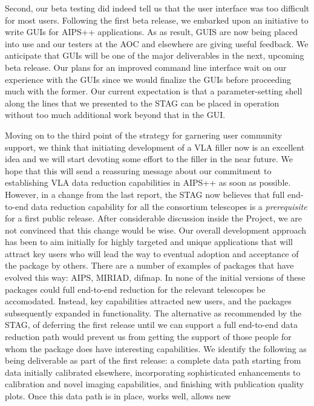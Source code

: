 Second, our beta testing did indeed tell us that the user interface
was too difficult for most users. Following the first beta release, we
embarked upon an initiative to write GUIs for AIPS++ applications. As
as result, GUIS are now being placed into use and our testers at the
AOC and elsewhere are giving useful feedback. We anticipate that GUIs
will be one of the major deliverables in the next, upcoming beta
release. Our plans for an improved command line interface wait on our
experience with the GUIs since we would finalize the GUIs before
proceeding much with the former. Our current expectation is that a
parameter-setting shell along the lines that we presented to the STAG
can be placed in operation without too much additional work beyond
that in the GUI.

Moving on to the third point of the strategy for garnering user
community support, we think that initiating development of a VLA
filler now is an excellent idea and we will start devoting some effort
to the filler in the near future. We hope that this will send a
reassuring message about our commitment to establishing VLA data
reduction capabilities in AIPS++ as soon as possible.  However, in a
change from the last report, the STAG now believes that full
end-to-end data reduction capability for all the consortium telescopes
is a {\em prerequisite} for a first public release. After considerable
discussion inside the Project, we are not convinced that this change
would be wise. Our overall development approach has been to aim
initially for highly targeted and unique applications that will
attract key users who will lead the way to eventual adoption and
acceptance of the package by others. There are a number of examples of
packages that have evolved this way: AIPS, MIRIAD, difmap. In none of
the initial versions of these packages could full end-to-end reduction
for the relevant telescopes be accomodated. Instead, key capabilities
attracted new users, and the packages subsequently expanded in
functionality. The alternative as recommended by the STAG, of
deferring the first release until we can support a full end-to-end
data reduction path would prevent us from getting the support of those
people for whom the package does have interesting capabilities. We
identify the following as being deliverable as part of the first
release: a complete data path starting from data initially calibrated
elsewhere, incorporating sophisticated enhancements to calibration and
novel imaging capabilities, and finishing with publication quality
plots.  Once this data path is in place, works well, allows new
